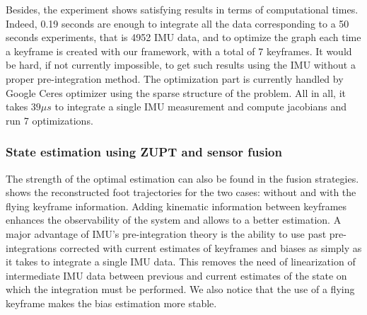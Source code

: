 Besides, the experiment shows satisfying results in terms of computational times. Indeed, 0.19 seconds are enough to integrate all the data corresponding to a 50 seconds experiments, that is 4952 IMU data, and to optimize the graph each time a keyframe is created with our framework,
with a total of 7 keyframes. It would be hard, if not currently impossible, to get such results using the IMU without a proper pre-integration method.
The optimization part is currently handled by Google Ceres optimizer \cite{Agarwal} using the sparse structure of the problem. All in all, it takes $39 \mu s$ to integrate a single IMU measurement and compute jacobians and run 7 optimizations.

\subsubsection{State estimation using ZUPT and sensor fusion}

The strength of the optimal estimation can also be found in the fusion strategies. 
 shows the reconstructed foot trajectories for the two cases: without and with the flying keyframe information. Adding kinematic information between keyframes enhances the observability of the system and allows to a better estimation.
A major advantage of IMU's pre-integration theory is the ability to use past pre-integrations corrected with current estimates of keyframes and biases as simply as it takes to integrate a single IMU data. This removes the need of linearization of
intermediate IMU data between previous and current estimates of the state on which the integration must be performed. We also notice that the use of a flying keyframe makes the bias estimation more stable.


